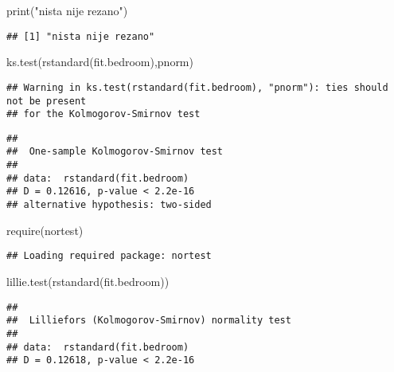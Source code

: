 \documentclass[
]{article}
\newenvironment{Shaded}{\begin{snugshade}}{\end{snugshade}}
\newcommand{\FunctionTok}[1]{\textcolor[rgb]{0.00,0.00,0.00}{#1}}
\newcommand{\NormalTok}[1]{#1}
\newcommand{\StringTok}[1]{\textcolor[rgb]{0.31,0.60,0.02}{#1}}
\begin{document}
\begin{Shaded}
\begin{Highlighting}[]
\FunctionTok{print}\NormalTok{(}\StringTok{"nista nije rezano"}\NormalTok{)}
\end{Highlighting}
\end{Shaded}

\begin{verbatim}
## [1] "nista nije rezano"
\end{verbatim}

\begin{Shaded}
\begin{Highlighting}[]
\FunctionTok{ks.test}\NormalTok{(}\FunctionTok{rstandard}\NormalTok{(fit.bedroom),}\StringTok{\textquotesingle{}pnorm\textquotesingle{}}\NormalTok{)}
\end{Highlighting}
\end{Shaded}

\begin{verbatim}
## Warning in ks.test(rstandard(fit.bedroom), "pnorm"): ties should not be present
## for the Kolmogorov-Smirnov test
\end{verbatim}

\begin{verbatim}
## 
##  One-sample Kolmogorov-Smirnov test
## 
## data:  rstandard(fit.bedroom)
## D = 0.12616, p-value < 2.2e-16
## alternative hypothesis: two-sided
\end{verbatim}

\begin{Shaded}
\begin{Highlighting}[]
\FunctionTok{require}\NormalTok{(nortest)}
\end{Highlighting}
\end{Shaded}

\begin{verbatim}
## Loading required package: nortest
\end{verbatim}

\begin{Shaded}
\begin{Highlighting}[]
\FunctionTok{lillie.test}\NormalTok{(}\FunctionTok{rstandard}\NormalTok{(fit.bedroom))}
\end{Highlighting}
\end{Shaded}

\begin{verbatim}
## 
##  Lilliefors (Kolmogorov-Smirnov) normality test
## 
## data:  rstandard(fit.bedroom)
## D = 0.12618, p-value < 2.2e-16
\end{verbatim}
\end{document}
